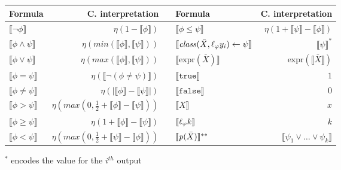 
\begin{table}
    \centering
    \begin{tabularx}{\textwidth}{l|r||cl|r}
        \textbf{Formula} & \textbf{C. interpretation} & & \textbf{Formula} & \textbf{C. interpretation}
        \\
        \hline\hline
        $\llbracket\neg \phi\rrbracket$ & $\eta(1 - \llbracket\phi\rrbracket)$ & & $\llbracket\phi \le \psi\rrbracket$  & $\eta(1 + \llbracket \psi \rrbracket - \llbracket \phi \rrbracket)$  %
        \\
        $\llbracket\phi  \wedge \psi\rrbracket$ &  $\eta(min(\llbracket\phi\rrbracket, \llbracket\psi\rrbracket))$ & &  $\llbracket \mathit{class}(\bar{X}, \ell_{\varphi}{y}_i) \leftarrow \psi \rrbracket$ & $\llbracket \psi \rrbracket^{*}$ %
        \\
        $\llbracket\phi  \vee \psi\rrbracket$ & $\eta(max(\llbracket\phi\rrbracket, \llbracket\psi\rrbracket))$ & & $\llbracket \text{expr}(\bar{X}) \rrbracket$ & $\text{expr}(\llbracket\bar{X}\rrbracket)$ %
        \\
        $\llbracket\phi = \psi\rrbracket$ & $\eta(\llbracket\neg( \phi \ne \psi )\rrbracket )$ & &$\llbracket \mathtt{true} \rrbracket$ & $1$ %
        \\
        $\llbracket\phi \ne \psi\rrbracket$ & $\eta(|\llbracket\phi\rrbracket-\llbracket\psi\rrbracket|)$ & & $\llbracket \mathtt{false} \rrbracket$ & $0$ %
        \\
        $\llbracket\phi > \psi\rrbracket$ & $\eta(max(0, \frac{1}{2} + \llbracket\phi\rrbracket - \llbracket\psi\rrbracket))$ & & $\llbracket X \rrbracket$ & $x$ %
        \\
        $\llbracket\phi \ge \psi\rrbracket$  & $\eta(1 + \llbracket \phi \rrbracket - \llbracket \psi \rrbracket)$ & & $\llbracket \ell_{\varphi}{k} \rrbracket$ & $k$ %
        \\
        $\llbracket\phi < \psi\rrbracket$  &  $\eta(max(0, \frac{1}{2} + \llbracket\psi\rrbracket - \llbracket\phi\rrbracket))$ & & $\llbracket \mathit{p}(\bar{X}) \rrbracket^{**}$ & $\llbracket \psi_1 \vee \ldots \vee \psi_k \rrbracket$ %
    \end{tabularx}
    \begin{center}\scriptsize
        $^{*}$ encodes the value for the $i^{th}$ output
        \\

\end{center}
\end{table}
